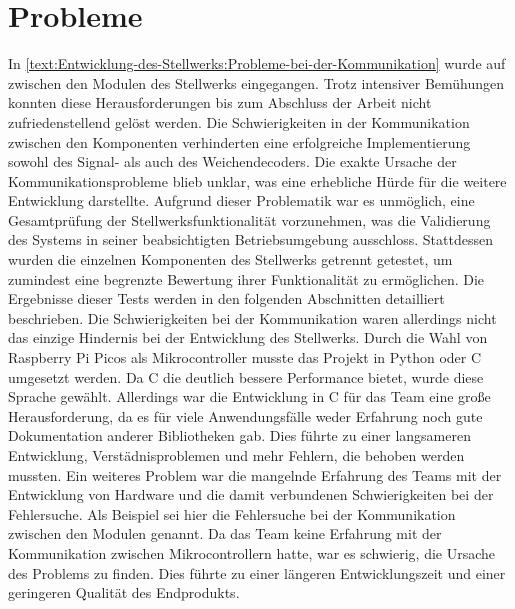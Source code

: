 \section{Probleme}\label{text:Auswertung:Probleme}

In \autoref{text:Entwicklung-des-Stellwerks:Probleme-bei-der-Kommunikation} wurde auf  zwischen den Modulen des Stellwerks eingegangen. Trotz intensiver Bemühungen konnten diese Herausforderungen bis zum Abschluss der Arbeit nicht zufriedenstellend gelöst werden. Die Schwierigkeiten in der Kommunikation zwischen den Komponenten verhinderten eine erfolgreiche Implementierung sowohl des Signal- als auch des Weichendecoders. Die exakte Ursache der Kommunikationsprobleme blieb unklar, was eine erhebliche Hürde für die weitere Entwicklung darstellte. Aufgrund dieser Problematik war es unmöglich, eine Gesamtprüfung der Stellwerksfunktionalität vorzunehmen, was die Validierung des Systems in seiner beabsichtigten Betriebsumgebung ausschloss. Stattdessen wurden die einzelnen Komponenten des Stellwerks getrennt getestet, um zumindest eine begrenzte Bewertung ihrer Funktionalität zu ermöglichen. Die Ergebnisse dieser Tests werden in den folgenden Abschnitten detailliert beschrieben.
\newline
Die Schwierigkeiten bei der Kommunikation waren allerdings nicht das einzige Hindernis bei der Entwicklung des Stellwerks. Durch die Wahl von Raspberry Pi Picos als Mikrocontroller musste das Projekt in Python oder C umgesetzt werden. Da C die deutlich bessere Performance bietet, wurde diese Sprache gewählt. Allerdings war die Entwicklung in C für das Team eine große Herausforderung, da es für viele Anwendungsfälle weder Erfahrung noch gute Dokumentation anderer Bibliotheken gab. Dies führte zu einer langsameren Entwicklung, Verstädnisproblemen und mehr Fehlern, die behoben werden mussten. Ein weiteres Problem war die mangelnde Erfahrung des Teams mit der Entwicklung von Hardware und die damit verbundenen Schwierigkeiten bei der Fehlersuche. Als Beispiel sei hier die Fehlersuche bei der Kommunikation zwischen den Modulen genannt. Da das Team keine Erfahrung mit der Kommunikation zwischen Mikrocontrollern hatte, war es schwierig, die Ursache des Problems zu finden. Dies führte zu einer längeren Entwicklungszeit und einer geringeren Qualität des Endprodukts.